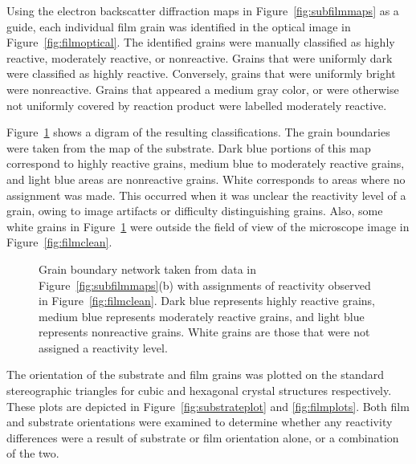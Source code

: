 \documentclass[12pt,%
              twoside,
               letterpaper]{uiothesis}
\begin{document}
Using the electron backscatter diffraction maps in Figure~\ref{fig:subfilmmaps} as a guide,
each individual film grain was identified in the optical image in Figure~\ref{fig:filmoptical}.
The identified grains were manually classified as highly reactive, moderately reactive, or
nonreactive. Grains that were uniformly dark were classified as highly reactive.
Conversely, grains that were uniformly bright were nonreactive. Grains that appeared a
medium gray color, or were otherwise not uniformly covered by reaction product were
labelled moderately reactive.

Figure~\ref{fig:labeledgrains} shows a digram of the resulting classifications. The grain
boundaries were taken from the  map of the substrate. Dark blue portions of
this map correspond to highly reactive grains, medium blue to moderately reactive grains,
and light blue areas are nonreactive grains. White corresponds to areas where no
assignment was made. This occurred when it was unclear the reactivity level of a grain,
owing to image artifacts or difficulty distinguishing grains. Also, some white grains in
Figure~\ref{fig:labeledgrains} were outside the field of view of the microscope image in
Figure~\ref{fig:filmclean}.
\begin{figure}
		\caption[Reactivity assignments for film]{%
			Grain boundary network taken from  data in 
			Figure~\ref{fig:subfilmmaps}(b) with assignments of reactivity
			observed in Figure~\ref{fig:filmclean}. Dark blue represents 
			highly reactive grains, medium blue represents moderately
			reactive grains, and light blue represents nonreactive 
			grains. White grains are those that were not assigned a 
			reactivity level.}
	\label{fig:labeledgrains}
\end{figure}

The orientation of the substrate and film grains was plotted on the standard stereographic
triangles for cubic and hexagonal crystal structures respectively. These plots are
depicted in Figure~\ref{fig:substrateplot} and \ref{fig:filmplots}. Both film and substrate
orientations were examined to determine whether any reactivity differences were a result
of substrate or film orientation alone, or a combination of the two.
\end{document}

